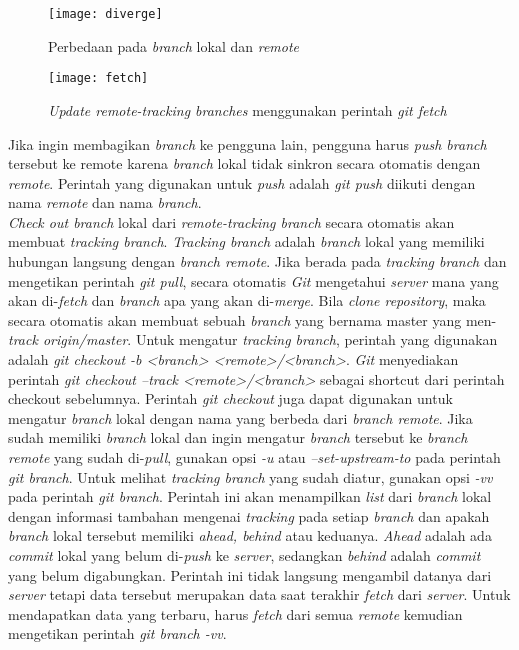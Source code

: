 \begin{figure}[H]
	\centering  
	\texttt{[image: diverge]}  
	\caption[Perbedaan pada \textit{branch} lokal dan \textit{remote}]{Perbedaan pada \textit{branch} lokal dan \textit{remote}}
	\label{fig:diverge} 
\end{figure}

\begin{figure}[H]
	\centering  
	\texttt{[image: fetch]}  
	\caption[\textit{Update remote-tracking branches} menggunakan perintah \textit{git fetch}]{\textit{Update remote-tracking branches} menggunakan perintah \textit{git fetch}}
	\label{fig:fetch} 
\end{figure}

Jika ingin membagikan \textit{branch} ke pengguna lain, pengguna harus \textit{push branch} tersebut ke remote karena \textit{branch} lokal tidak sinkron secara otomatis dengan \textit{remote}. Perintah yang digunakan untuk \textit{push} adalah \textit{git push} diikuti dengan nama \textit{remote} dan nama \textit{branch}.\\ 

\textit{Check out branch} lokal dari \textit{remote-tracking branch} secara otomatis akan membuat \textit{tracking branch}. \textit{Tracking branch} adalah \textit{branch} lokal yang memiliki hubungan langsung dengan \textit{branch remote}. Jika berada pada \textit{tracking branch} dan mengetikan perintah \textit{git pull}, secara otomatis \textit{Git} mengetahui \textit{server} mana yang akan di-\textit{fetch} dan \textit{branch} apa yang akan di-\textit{merge}. Bila \textit{clone repository}, maka secara otomatis akan membuat sebuah \textit{branch} yang bernama master yang men-\textit{track origin/master}. Untuk mengatur \textit{tracking branch}, perintah yang digunakan adalah \textit{git checkout -b <branch> <remote>/<branch>}. \textit{Git} menyediakan perintah \textit{git checkout --track <remote>/<branch>} sebagai shortcut dari perintah checkout sebelumnya. Perintah \textit{git checkout} juga dapat digunakan untuk mengatur \textit{branch} lokal dengan nama yang berbeda dari \textit{branch remote}. Jika sudah memiliki \textit{branch} lokal dan ingin mengatur \textit{branch} tersebut ke \textit{branch remote} yang sudah di-\textit{pull}, gunakan opsi \textit{-u} atau \textit{--set-upstream-to} pada perintah \textit{git branch}. Untuk melihat \textit{tracking branch} yang sudah diatur, gunakan opsi \textit{-vv} pada perintah \textit{git branch}. Perintah ini akan menampilkan \textit{list} dari \textit{branch} lokal dengan informasi tambahan mengenai \textit{tracking} pada setiap \textit{branch} dan apakah \textit{branch} lokal tersebut memiliki \textit{ahead, behind} atau keduanya. \textit{Ahead} adalah ada \textit{commit} lokal yang belum di-\textit{push} ke \textit{server}, sedangkan \textit{behind} adalah \textit{commit} yang belum digabungkan. Perintah ini tidak langsung mengambil datanya dari \textit{server} tetapi data tersebut merupakan data saat terakhir \textit{fetch} dari \textit{server}. Untuk mendapatkan data yang terbaru, harus \textit{fetch} dari semua \textit{remote} kemudian mengetikan perintah \textit{git branch -vv}.

